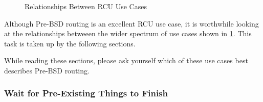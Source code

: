 \begin{figure}
{  
}
\caption{Relationships Between RCU Use Cases}
\label{fig:defer:Relationships Between RCU Use Cases}
\end{figure}

Although Pre-BSD routing is an excellent RCU use case, it is worthwhile
looking at the relationships betweeen the wider spectrum of use cases
shown in
\cref{fig:defer:Relationships Between RCU Use Cases}.
This task is taken up by the following sections.

While reading these sections, please ask yourself which of these
use cases best describes Pre-BSD routing.

\subsubsection{Wait for Pre-Existing Things to Finish}
\label{sec:defer:Wait for Pre-Existing Things to Finish}

